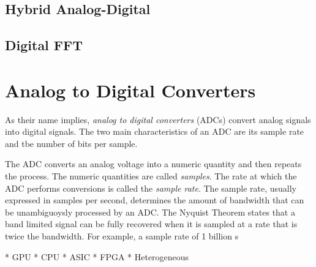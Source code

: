 \documentclass{article}
\begin{document}
\subsection{Hybrid Analog-Digital}\label{hybrid-analog-digital}

\subsection{Digital FFT}\label{digital-fft}

\section{Analog to Digital
Converters}\label{analog-to-digital-converters}

As their name implies, \emph{analog to digital converters} (ADCs)
convert analog signals into digital signals. The two main
characteristics of an ADC are its sample rate and tbe number of bits per
sample.

The ADC converts an analog voltage into a numeric quantity and then
repeats the process. The numeric quantities are called \emph{samples}.
The rate at which the ADC performs conversions is called the
\emph{sample rate}. The sample rate, usually expressed in samples per
second, determines the amount of bandwidth that can be unambiguoysly
processed by an ADC. The Nyquist Theorem states that a band limited
signal can be fully recovered when it is sampled at a rate that is twice
the bandwidth. For example, a sample rate of 1 billion s












    * GPU
    * CPU
    * ASIC
    * FPGA
    * Heterogeneous











%
\end{document}
